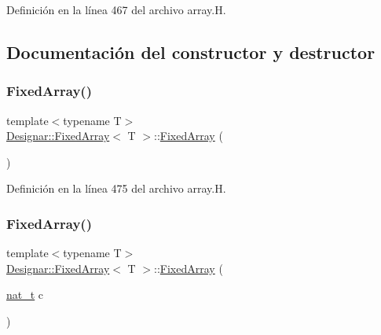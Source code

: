 Definición en la línea 467 del archivo array.\+H.



\subsection{Documentación del constructor y destructor}
\mbox{\label{class_designar_1_1_fixed_array_a493a48e7c23b6b882a96c5451d10248a}} 
\subsubsection{\texorpdfstring{Fixed\+Array()}{FixedArray()}\hspace{0.1cm}{\footnotesize\ttfamily [1/6]}}
{\footnotesize\ttfamily template$<$typename T$>$ \\
\hyperlink{class_designar_1_1_fixed_array}{Designar\+::\+Fixed\+Array}$<$ T $>$\+::\hyperlink{class_designar_1_1_fixed_array}{Fixed\+Array} (\begin{DoxyParamCaption}{ }\end{DoxyParamCaption})\hspace{0.3cm}{\ttfamily [inline]}}



Definición en la línea 475 del archivo array.\+H.

\mbox{\label{class_designar_1_1_fixed_array_ac3bed73485d717ddc1fc412d3e7fea58}} 
\subsubsection{\texorpdfstring{Fixed\+Array()}{FixedArray()}\hspace{0.1cm}{\footnotesize\ttfamily [2/6]}}
{\footnotesize\ttfamily template$<$typename T$>$ \\
\hyperlink{class_designar_1_1_fixed_array}{Designar\+::\+Fixed\+Array}$<$ T $>$\+::\hyperlink{class_designar_1_1_fixed_array}{Fixed\+Array} (\begin{DoxyParamCaption}\item[{\hyperlink{namespace_designar_aa72662848b9f4815e7bf31a7cf3e33d1}{nat\+\_\+t}}]{c }\end{DoxyParamCaption})\hspace{0.3cm}{\ttfamily [inline]}}



